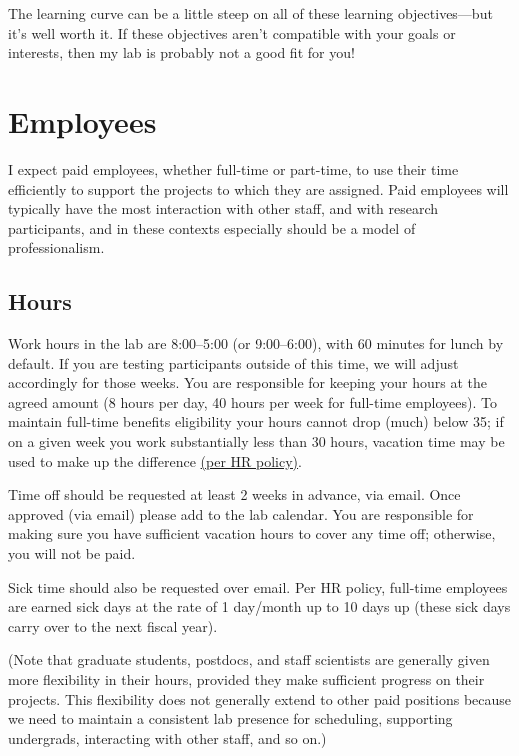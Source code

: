 \documentclass[letterpaper,12pt,oneside]{memoir}
\begin{document}
The learning curve can be a little steep on all of these learning objectives---but it's well worth it. If these objectives aren't compatible with your goals or interests, then my lab is probably not a good fit for you!



\section{Employees}

I expect paid employees, whether full-time or part-time, to use their time efficiently to support the projects to which they are assigned. Paid employees will typically have the most interaction with other staff, and with research participants, and in these contexts especially should be a model of professionalism.

\subsection{Hours}
Work hours in the lab are 8:00--5:00 (or 9:00--6:00), with 60 minutes for lunch by default. If you are testing participants outside of this time, we will adjust accordingly for those weeks. You are responsible for keeping your hours at the agreed amount (8 hours per day, 40 hours per week for full-time employees). To maintain full-time benefits eligibility your hours cannot drop (much) below 35; if on a given week you work substantially less than 30 hours, vacation time may be used to make up the difference \href{http://www.temple.edu/hr/departments/employeerelations/documents/Employee_Manual_Feb_2016.pdf}{(per HR policy)}.

Time off should be requested at least 2 weeks in advance, via email. Once approved (via email) please add to the lab calendar. You are responsible for making sure you have sufficient vacation hours to cover any time off; otherwise, you will not be paid.

Sick time should also be requested over email. Per HR policy, full-time employees are earned sick days at the rate of 1 day/month up to 10 days up (these sick days carry over to the next fiscal year).

(Note that graduate students, postdocs, and staff scientists are generally given more flexibility in their hours, provided they make sufficient progress on their projects. This flexibility does not generally extend to other paid positions because we need to maintain a consistent lab presence for scheduling, supporting undergrads, interacting with other staff, and so on.)
\end{document}
